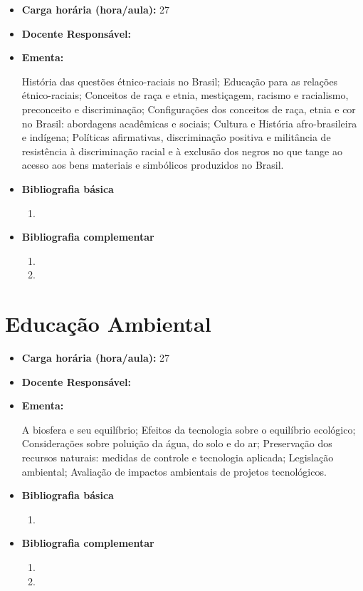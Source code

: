 \documentclass[11pt,fleqn]{book} %
\begin{document}
\begin{itemize}
	\item \textbf{Carga horária (hora/aula):} 27
	\item \textbf{Docente Responsável:}~
	\item \textbf{Ementa:} 

	História das questões étnico-raciais no Brasil;
	Educação para as relações étnico-raciais;
	Conceitos de raça e etnia, mestiçagem, racismo e racialismo, preconceito e discriminação;
	Configurações dos conceitos de raça, etnia e cor no Brasil: abordagens acadêmicas e sociais;
	Cultura e História afro-brasileira e indígena;
	Políticas afirmativas, discriminação positiva e militância de resistência à discriminação racial e à exclusão dos negros no que tange ao acesso aos bens materiais e simbólicos produzidos no Brasil.
	
	\item \textbf{Bibliografia básica}
	\begin{enumerate}
		\item 
	\end{enumerate}
	\item \textbf{Bibliografia complementar}
	\begin{enumerate}
		\item
		\item 
	\end{enumerate}
\end{itemize}



\newpage
\section{Educação Ambiental}\label{disc:educamb}

\begin{itemize}
	\item \textbf{Carga horária (hora/aula):} 27
	\item \textbf{Docente Responsável:}~
	\item \textbf{Ementa:} 

	A biosfera e seu equilíbrio;
	Efeitos da tecnologia sobre o equilíbrio ecológico;
	Considerações sobre poluição da água, do solo e do ar;
	Preservação dos recursos naturais: medidas de controle e tecnologia aplicada;
	Legislação ambiental;
	Avaliação de impactos ambientais de projetos tecnológicos.
	
	\item \textbf{Bibliografia básica}
	\begin{enumerate}
		\item 
	\end{enumerate}
	\item \textbf{Bibliografia complementar}
	\begin{enumerate}
		\item
		\item 
	\end{enumerate}
\end{itemize}
\end{document}
